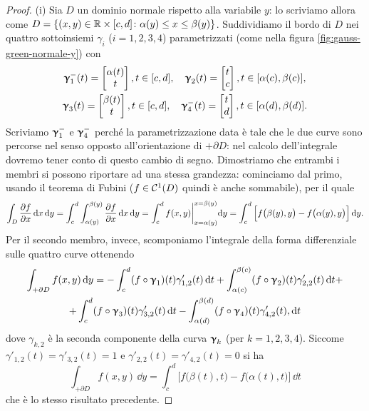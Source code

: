 \begin{proof}
	
	(i) Sia $D$ un dominio normale rispetto alla variabile $y$: lo scriviamo allora come $D=\{(x,y)\in\mathbb{R}\times[c,d]\colon \alpha(y)\leq x\leq\beta(y)\}$.
	Suddividiamo il bordo di $D$ nei quattro sottoinsiemi $\gamma_i$ ($i=1,2,3,4$) parametrizzati (come nella figura \ref{fig:gauss-green-normale-y}) con
	\begin{gather*}
		\bm{\upgamma}_1^-(t)=
		\begin{bmatrix}
			\alpha(t)\\t
		\end{bmatrix}, t\in[c,d],\quad
		\bm{\upgamma}_2(t)=
		\begin{bmatrix}
			t\\c
		\end{bmatrix}, t\in[\alpha(c),\beta(c)],\\
		\bm{\upgamma}_3(t)=
		\begin{bmatrix}
			\beta(t)\\t
		\end{bmatrix}, t\in[c,d],\quad 
		\bm{\upgamma}_4^-(t)=
		\begin{bmatrix}
			t\\d
		\end{bmatrix}, t\in[\alpha(d),\beta(d)].
	\end{gather*}
	Scriviamo $\bm{\upgamma}_1^-$ e $\bm{\upgamma}_4^-$ perch\'e la parametrizzazione data è tale che le due curve sono percorse nel senso opposto all'orientazione di $+\partial D$: nel calcolo dell'integrale dovremo tener conto di questo cambio di segno.
	Dimostriamo che entrambi i membri si possono riportare ad una stessa grandezza: cominciamo dal primo, usando il teorema di Fubini ($f\in\mathcal{C}^{{1}}(D)$ quindi è anche sommabile), per il quale
	\begin{equation}
		\int_D\frac{\partial {f}}{\partial {x}}\,\textup{d} x\,\textup{d} y=\int_c^d\int_{\alpha(y)}^{\beta(y)}\frac{\partial {f}}{\partial {x}}\,\textup{d} x\,\textup{d} y=\int_c^df(x,y)\bigg|_{x=\alpha(y)}^{x=\beta(y)}\textup{d} y=\int_c^d\Big[f\big(\beta(y),y\big)-f\big(\alpha(y),y\big)\Big]\,\textup{d} y.
	\end{equation}
	Per il secondo membro, invece, scomponiamo l'integrale della forma differenziale sulle quattro curve ottenendo
	\begin{multline}
		\int_{+\partial D}f(x,y)\,\textup{d} y=
		-\int_c^d(f\circ\bm{\upgamma}_1)(t)\gamma'_{1,2}(t)\,\textup{d} t
		+\int_{\alpha(c)}^{\beta(c)}(f\circ\bm{\upgamma}_2)(t)\gamma'_{2,2}(t)\,\textup{d} t+\\
		+\int_c^d(f\circ\bm{\upgamma}_3)(t)\gamma'_{3,2}(t)\,\textup{d} t
		-\int_{\alpha(d)}^{\beta(d)}(f\circ\bm{\upgamma}_4)(t)\gamma'_{4,2}(t),\textup{d} t
	\end{multline}
	dove $\gamma_{k,2}$ è la seconda componente della curva $\bm{\upgamma}_k$ (per $k=1,2,3,4$).
	Siccome $\gamma'_{1,2}(t)=\gamma'_{3,2}(t)=1$ e $\gamma'_{2,2}(t)=\gamma'_{4,2}(t)=0$ si ha
	\begin{equation}
		\int_{+\partial D}f(x,y)\,\dd y=\int_c^d\Big[f\big(\beta(t),t\big)-f\big(\alpha(t),t\big)\Big]\,\dd t
	\end{equation}
	che è lo stesso risultato precedente.


\end{proof}
